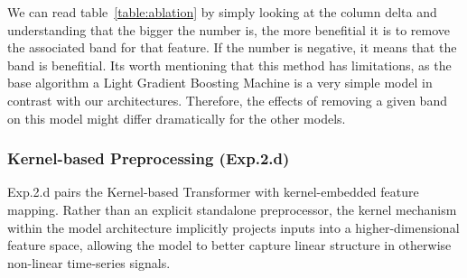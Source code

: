 
\medbreak
We can read table~\ref{table:ablation} by simply looking at the column delta and understanding that the
bigger the number is, the more benefitial it is to remove the associated band for that feature. If the number is negative,
it means that the band is benefitial. Its worth mentioning that this method has limitations, as the base algorithm \- a Light Gradient Boosting Machine \- is a very simple model in contrast
with our architectures. Therefore, the effects of removing a given band on this model might differ dramatically for the other models.

\subsubsection{Kernel-based Preprocessing (Exp.2.d)}
Exp.2.d pairs the Kernel-based Transformer with kernel-embedded feature mapping. Rather than an explicit standalone preprocessor, the kernel mechanism within the model architecture implicitly projects inputs into a higher-dimensional feature space, allowing the model to better capture linear structure in otherwise non-linear time-series signals.